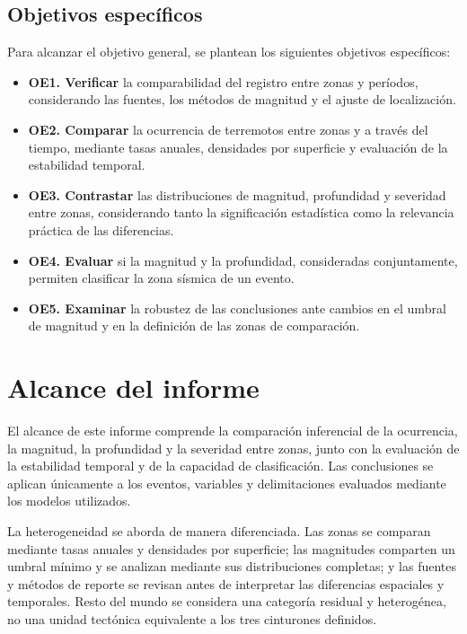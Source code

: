\documentclass[
  spanish,
  letterpaper,
  DIV=11,
  numbers=noendperiod]{scrartcl}
\begin{document}
\subsection{Objetivos específicos}\label{objetivos-especuxedficos}

Para alcanzar el objetivo general, se plantean los siguientes objetivos
específicos:

\begin{itemize}
\setlength{\itemsep}{0.9em}

\item \textbf{OE1. Verificar} la comparabilidad del registro entre zonas y períodos, considerando las fuentes, los métodos de magnitud y el ajuste de localización.

\item \textbf{OE2. Comparar} la ocurrencia de terremotos entre zonas y a través del tiempo, mediante tasas anuales, densidades por superficie y evaluación de la estabilidad temporal.

\item \textbf{OE3. Contrastar} las distribuciones de magnitud, profundidad y severidad entre zonas, considerando tanto la significación estadística como la relevancia práctica de las diferencias.

\item \textbf{OE4. Evaluar} si la magnitud y la profundidad, consideradas conjuntamente, permiten clasificar la zona sísmica de un evento.

\item \textbf{OE5. Examinar} la robustez de las conclusiones ante cambios en el umbral de magnitud y en la definición de las zonas de comparación.

\end{itemize}

\newpage

\section{Alcance del informe}\label{alcance-del-informe}

El alcance de este informe comprende la comparación inferencial de la
ocurrencia, la magnitud, la profundidad y la severidad entre zonas,
junto con la evaluación de la estabilidad temporal y de la capacidad de
clasificación. Las conclusiones se aplican únicamente a los eventos,
variables y delimitaciones evaluados mediante los modelos utilizados.

La heterogeneidad se aborda de manera diferenciada. Las zonas se
comparan mediante tasas anuales y densidades por superficie; las
magnitudes comparten un umbral mínimo y se analizan mediante sus
distribuciones completas; y las fuentes y métodos de reporte se revisan
antes de interpretar las diferencias espaciales y temporales. Resto del
mundo se considera una categoría residual y heterogénea, no una unidad
tectónica equivalente a los tres cinturones definidos.
\end{document}
